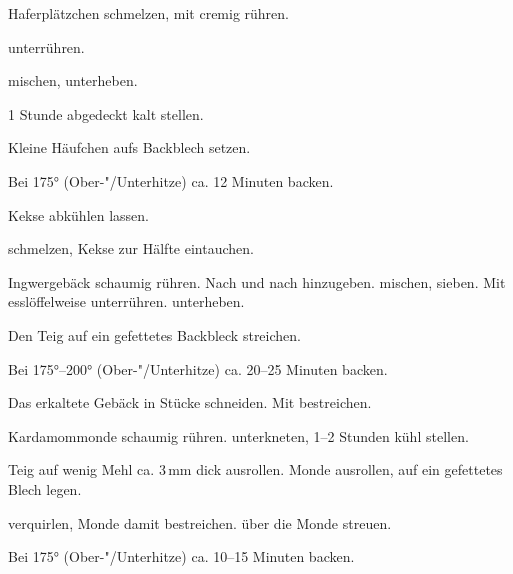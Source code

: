 \begin{recipe}{Haferplätzchen}
  schmelzen, mit
  cremig rühren.

  unterrühren.

  mischen, unterheben.

  1 Stunde abgedeckt kalt stellen.

  Kleine Häufchen aufs Backblech setzen.

  Bei 175° (Ober-"/Unterhitze) ca. 12 Minuten backen.

  Kekse abkühlen lassen.

  schmelzen, Kekse zur Hälfte eintauchen.
\end{recipe}



\begin{recipe}{Ingwergebäck}
  schaumig rühren. Nach und nach
  hinzugeben.
  mischen, sieben. Mit
  esslöffelweise unterrühren.
  unterheben.

  Den Teig auf ein gefettetes Backbleck streichen.

  Bei 175°--200° (Ober-"/Unterhitze) ca. 20--25 Minuten backen.

  Das erkaltete Gebäck in Stücke schneiden. Mit
  bestreichen.
\end{recipe}



\begin{recipe}{Kardamommonde}
  schaumig rühren.
  unterkneten, 1--2 Stunden kühl stellen.

  Teig auf wenig Mehl ca. 3\,mm dick ausrollen. Monde ausrollen, auf ein
  gefettetes Blech legen.

  verquirlen, Monde damit bestreichen.
  über die Monde streuen.

  Bei 175° (Ober-"/Unterhitze) ca. 10--15 Minuten backen.
\end{recipe}



